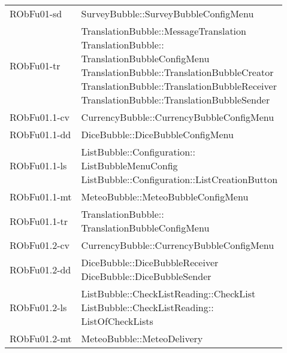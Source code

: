 \begin{center}
\begin{longtable}{|
*{1}{>{\centering\arraybackslash}m{2.5cm}|}
*{1}{>{\centering\arraybackslash}m{7.5cm}|}}
{\\}\\\hline
RObFu01-sd & \makecell[l]{SurveyBubble::SurveyBubbleConfigMenu
\\}\\\hline
RObFu01-tr & \makecell[l]{TranslationBubble::MessageTranslation
\\TranslationBubble:: \\ \hfill TranslationBubbleConfigMenu
\\TranslationBubble::TranslationBubbleCreator
\\TranslationBubble::TranslationBubbleReceiver
\\TranslationBubble::TranslationBubbleSender
\\}\\\hline
RObFu01.1-cv & \makecell[l]{CurrencyBubble::CurrencyBubbleConfigMenu
\\}\\\hline
RObFu01.1-dd & \makecell[l]{DiceBubble::DiceBubbleConfigMenu
\\}\\\hline
RObFu01.1-ls & \makecell[l]{ListBubble::Configuration:: \\ \hfill ListBubbleMenuConfig
\\ListBubble::Configuration::ListCreationButton
\\}\\\hline
RObFu01.1-mt & \makecell[l]{MeteoBubble::MeteoBubbleConfigMenu
\\}\\\hline
RObFu01.1-tr & \makecell[l]{TranslationBubble:: \\ \hfill TranslationBubbleConfigMenu
\\}\\\hline
RObFu01.2-cv & \makecell[l]{CurrencyBubble::CurrencyBubbleConfigMenu
\\}\\\hline
RObFu01.2-dd & \makecell[l]{DiceBubble::DiceBubbleReceiver
\\DiceBubble::DiceBubbleSender
\\}\\\hline
RObFu01.2-ls & \makecell[l]{ListBubble::CheckListReading::CheckList
\\ListBubble::CheckListReading:: \\ \hfill ListOfCheckLists
\\}\\\hline
RObFu01.2-mt & \makecell[l]{MeteoBubble::MeteoDelivery
\\}\\\hline

\end{longtable}
\end{center}
